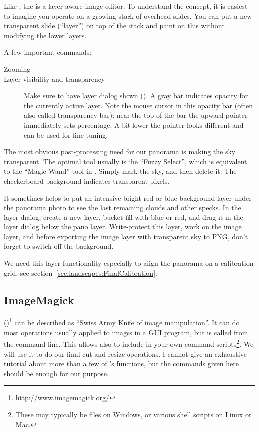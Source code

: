 Like , the  is a layer-aware image
editor. To understand the concept, it is easiest to imagine you
operate on a growing stack of overhead slides. You can put a new
transparent slide (``layer'') on top of the stack and paint on this
without modifying the lower layers.



A few important commands:

\begin{description}
\item[Zooming] 
\item[Layer visibility and transparency] Make sure to have layer
  dialog shown (). A gray bar indicates
  opacity for the currently active layer. Note the mouse cursor in
  this opacity bar (often also called transparency bar): near the top
  of the bar the upward pointer immediately sets percentage. A bit
  lower the pointer looks different and can be used for fine-tuning.
\end{description}


The most obvious post-processing need for our panorama is making the sky
transparent. The optimal tool usually is the ``Fuzzy Select'', which
is equivalent to the ``Magic Wand'' tool in . Simply mark the
sky, and then delete it. The checkerboard background indicates
transparent pixels.


It sometimes helps to put an intensive bright red or blue background layer under the
panorama photo to see the last remaining clouds and other specks. In the layer dialog,
create a new layer, bucket-fill with blue or red, and drag it in the
layer dialog below the pano layer. Write-protect this layer, work on
the image layer, and before exporting the image layer with transparent
sky to PNG, don't forget to switch off the background.

We need this layer functionality especially to align the panorama on a
calibration grid, see section~\ref{sec:landscapes:FinalCalibration}.





\subsection{ImageMagick}
\label{sec:landscapes:ImageMagick}

()\footnote{\url{http://www.imagemagick.org/}} can be
described as ``Swiss Army Knife of image manipulation''. It can do
most operations usually applied to images in a GUI program, but is
called from the command line. This allows also to include 
in your own command scripts\footnote{These may typically be
   files on Windows, or various shell scripts on Linux or
  Mac.}. We will use it to do our final cut and resize operations. I
cannot give an exhaustive tutorial about more than a few of
's functions, but the commands given here should be enough
for our purpose.

